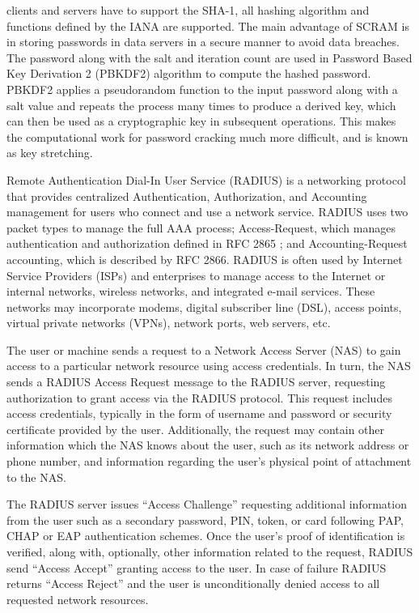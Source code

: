 \begin{multicols}{2}
\noindent
clients and servers have to support the SHA-1, all hashing algorithm and functions defined by the IANA are supported. The main advantage of SCRAM is in storing passwords in data servers in a secure manner to avoid data breaches. The password along with the salt and iteration count are used in Password Based Key Derivation 2 (PBKDF2) algorithm to compute the hashed password. PBKDF2 applies a pseudorandom function to the input password along with a salt value and repeats the process many times to produce a derived key, which can then be used as a cryptographic key in subsequent operations. This makes the computational work for password cracking much more difficult, and is known as key stretching.

Remote Authentication Dial-In User Service (RADIUS) is a networking protocol that provides centralized Authentication, Authorization, and Accounting management for users who connect and use a network service. RADIUS uses two packet types to manage the full AAA process; Access-Request, which manages authentication and authorization defined in RFC 2865 \cite{chap2-key8}; and Accounting-Request accounting, which is described by RFC 2866. RADIUS is often used by Internet Service Providers (ISPs) and enterprises to manage access to the Internet or internal networks, wireless networks, and integrated e-mail services. These networks may incorporate modems, digital subscriber line (DSL), access points, virtual private networks (VPNs), network ports, web servers, etc.

The user or machine sends a request to a Network Access Server (NAS) to gain access to a particular network resource using access credentials. In turn, the NAS sends a RADIUS Access Request message to the RADIUS server, requesting authorization to grant access via the RADIUS protocol. This request includes access credentials, typically in the form of username and password or security certificate provided by the user. Additionally, the request may contain other information which the NAS knows about the user, such as its network address or phone number, and information regarding the user's physical point of attachment to the NAS. 

The RADIUS server issues ``Access Challenge'' requesting additional information from the user such as a secondary password, PIN, token, or card following PAP, CHAP or EAP \cite{chap2-key9} authentication schemes. Once the user's proof of identification is verified, along with, optionally, other information related to the request, RADIUS send ``Access Accept'' granting access to the user. In case of failure RADIUS returns ``Access Reject'' and the user is unconditionally denied access to all requested network resources.


\end{multicols}
